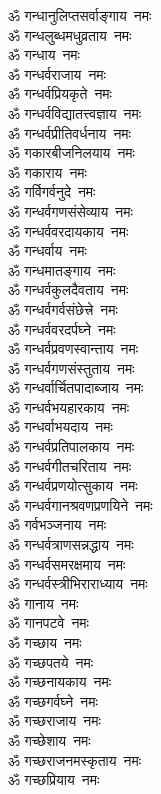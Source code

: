 \begin{multicols}{2}
\begin{flushleft}
ॐ गन्धानुलिप्तसर्वाङ्गाय~नमः\\
ॐ गन्धलुब्धमधुव्रताय~नमः\hfill{}\\
ॐ गन्धाय~नमः\\
ॐ गन्धर्वराजाय~नमः\\
ॐ गन्धर्वप्रियकृते~नमः\\
ॐ गन्धर्वविद्यातत्त्वज्ञाय~नमः\\
ॐ गन्धर्वप्रीतिवर्धनाय~नमः\\
ॐ गकारबीजनिलयाय~नमः\\
ॐ गकाराय~नमः\\
ॐ गर्विगर्वनुदे~नमः\\
ॐ गन्धर्वगणसंसेव्याय~नमः\\
ॐ गन्धर्ववरदायकाय~नमः\hfill{}\\
ॐ गन्धर्वाय~नमः\\
ॐ गन्धमातङ्गाय~नमः\\
ॐ गन्धर्वकुलदैवताय~नमः\\
ॐ गन्धर्वगर्वसंछेत्त्रे~नमः\\
ॐ गन्धर्ववरदर्पघ्ने~नमः\\
ॐ गन्धर्वप्रवणस्वान्ताय~नमः\\
ॐ गन्धर्वगणसंस्तुताय~नमः\\
ॐ गन्धर्वार्चितपादाब्जाय~नमः\\
ॐ गन्धर्वभयहारकाय~नमः\\
ॐ गन्धर्वाभयदाय~नमः\hfill{}\\
ॐ गन्धर्वप्रतिपालकाय~नमः\\
ॐ गन्धर्वगीतचरिताय~नमः\\
ॐ गन्धर्वप्रणयोत्सुकाय~नमः\\
ॐ गन्धर्वगानश्रवणप्रणयिने~नमः\\
ॐ गर्वभञ्जनाय~नमः\\
ॐ गन्धर्वत्राणसन्नद्धाय~नमः\\
ॐ गन्धर्वसमरक्षमाय~नमः\\
ॐ गन्धर्वस्त्रीभिराराध्याय~नमः\\
ॐ गानाय~नमः\\
ॐ गानपटवे~नमः\hfill{}\\
ॐ गच्छाय~नमः\\
ॐ गच्छपतये~नमः\\
ॐ गच्छनायकाय~नमः\\
ॐ गच्छगर्वघ्ने~नमः\\
ॐ गच्छराजाय~नमः\\
ॐ गच्छेशाय~नमः\\
ॐ गच्छराजनमस्कृताय~नमः\\
ॐ गच्छप्रियाय~नमः\\

\end{flushleft}
\end{multicols}
